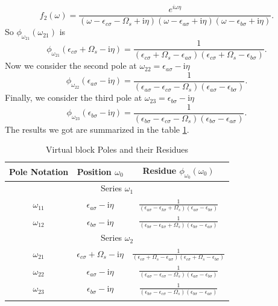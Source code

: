 \documentclass[12pt]{caltech_thesis}
\begin{document}
\begin{equation}
f_2(\omega) = \frac{e^{i\omega \eta }}{(\omega-\epsilon_{c \sigma}-\Omega_s+\mathrm{i} \eta)(\omega-\epsilon_{a \sigma}+\mathrm{i} \eta)(\omega-\epsilon_{b \sigma}+\mathrm{i} \eta)}.
\end{equation}
So $\phi_{\omega_{21}}(\omega _{21})$ is
\begin{equation}
\phi_{\omega_{21}}(\epsilon_{c \sigma} + \Omega_s - \mathrm{i} \eta) = \frac{1}{(\epsilon_{c \sigma} + \Omega_s -\epsilon_{a \sigma})(\epsilon_{c \sigma} + \Omega_s -\epsilon_{b \sigma})}.
\end{equation}
Now we consider the second pole at $\omega_{22} = \epsilon _{a\sigma } - \mathrm{i} \eta$
\begin{equation}
\phi_{\omega_{22}}(\epsilon_{a \sigma} - \mathrm{i} \eta) = \frac{1}{(\epsilon_{a \sigma} -\epsilon_{c \sigma}-\Omega_s)(\epsilon_{a \sigma} -\epsilon_{b \sigma})}.
\end{equation}
Finally, we consider the third pole at $\omega_{23} = \epsilon _{b\sigma } - \mathrm{i} \eta$
\begin{equation}
\phi_{\omega_{23}}(\epsilon_{b \sigma} - \mathrm{i} \eta) = \frac{1}{(\epsilon_{b \sigma} -\epsilon_{c \sigma}-\Omega_s)(\epsilon_{b \sigma} -\epsilon_{a \sigma})}.
\end{equation}
The results we got are summarized in the table \ref{tabpoles_residues_virtual}.\\
\begin{table}[h]
\centering
\caption{Virtual block Poles and their Residues}
\begin{tabular}{|c|c|c|}
\hline
Pole Notation & Position $\omega_0$ & Residue $\phi_{\omega_0}(\omega_0)$ \\
\hline
\multicolumn{3}{|c|}{Series $\omega_1$} \\
\hline
$\omega_{11}$ & $\epsilon_{a \sigma} - \mathrm{i} \eta$ & $\frac{1}{(\epsilon_{a \sigma} -\epsilon_{k \sigma}+\Omega_s)(\epsilon_{a \sigma} -\epsilon_{b \sigma})}$ \\
$\omega_{12}$ & $\epsilon_{b \sigma} - \mathrm{i} \eta$ & $\frac{1}{(\epsilon_{b \sigma} -\epsilon_{k \sigma}+\Omega_s)(\epsilon_{b \sigma} -\epsilon_{a \sigma})}$ \\
\hline
\multicolumn{3}{|c|}{Series $\omega_2$} \\
\hline
$\omega_{21}$ & $\epsilon_{c \sigma} + \Omega_s - \mathrm{i} \eta$ & $\frac{1}{(\epsilon_{c \sigma} + \Omega_s -\epsilon_{a \sigma})(\epsilon_{c \sigma} + \Omega_s -\epsilon_{b \sigma})}$ \\
$\omega_{22}$ & $\epsilon_{a \sigma} - \mathrm{i} \eta$ & $\frac{1}{(\epsilon_{a \sigma} -\epsilon_{c \sigma}-\Omega_s)(\epsilon_{a \sigma} -\epsilon_{b \sigma})}$ \\
$\omega_{23}$ & $\epsilon_{b \sigma} - \mathrm{i} \eta$ & $\frac{1}{(\epsilon_{b \sigma} -\epsilon_{c \sigma}-\Omega_s)(\epsilon_{b \sigma} -\epsilon_{a \sigma})}$ \\
\hline
\label{tabpoles_residues_virtual}
\end{tabular}
\end{table}
\end{document}
